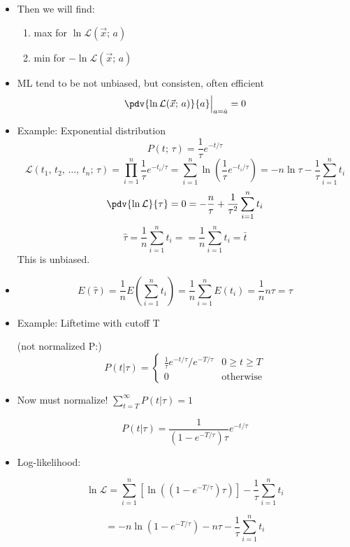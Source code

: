 \begin{itemize}
    \item Then we will find:

          \begin{enumerate}
              \item max for $\ln \mathcal{L}(\vec{x}; \, a)$
              \item min for $- \ln \mathcal{L}(\vec{x}; \, a)$
          \end{enumerate}

    \item ML tend to be not unbiased, but consisten, often efficient
          \[ \pdv{\ln \mathcal{L}(\vec{x}; \, a)}{a} \Big|_{a = \hat{a}} = 0 \]

    \item Example: Exponential distribution
          \[ P(t; \, \tau) = \frac{1}{\tau} e^{-t/\tau} \]
          \[ \mathcal{L}(t_1, \, t_2, \, \ldots, \, t_n; \, \tau) = \prod_{i=1}^n \frac{1}{\tau} e^{-t_i/\tau} = \sum_{i=1}^n \ln\left( \frac{1}{\tau} e^{-t_i/\tau} \right) = - n \ln \tau - \frac{1}{\tau} \sum_{i=1}^n t_i \]
          \[ \pdv{\ln \mathcal{L}}{\tau} = 0 = - \frac{n}{\tau} + \frac{1}{\tau^2} \sum_{i=1}^n t_i \]
          \[ \hat{\tau} = \frac{1}{n} \sum_{i=1}^n t_i = =\frac{1}{n} \sum_{i=1}^n t_i = \bar{t} \]
          This is unbiased.
    \item \[ E(\hat{\tau}) = \frac{1}{n} E(\sum_{i=1}^n t_i) = \frac{1}{n} \sum_{i=1}^n E(t_i) = \frac{1}{n} n \tau = \tau \]
    \item Example: Liftetime with cutoff T

          (not normalized P:)
          \[ P(t|\tau) = \begin{cases}
                  \frac{1}{\tau} e^{-t/\tau} / e^{-T/\tau} & 0 \geq t \geq T  \\
                  0                                        & \text{otherwise}
              \end{cases} \]

    \item Now must normalize! $\sum_{t=T}^{\infty} P(t|\tau) = 1$

          \[ P(t|\tau) = \frac{1}{(1-e^{-T/\tau}) \tau} e^{-t/\tau} \]

    \item Log-likelihood:

          \[ \ln \mathcal{L} = \sum_{i=1}^n \left[ \ln\left( (1-e^{-T/\tau}) \tau \right) \right] - \frac{1}{\tau} \sum_{i=1}^n t_i \]

          \[ = -n \ln (1-e^{-T/\tau}) - n \tau - \frac{1}{\tau} \sum_{i=1}^n t_i \]


\end{itemize}
